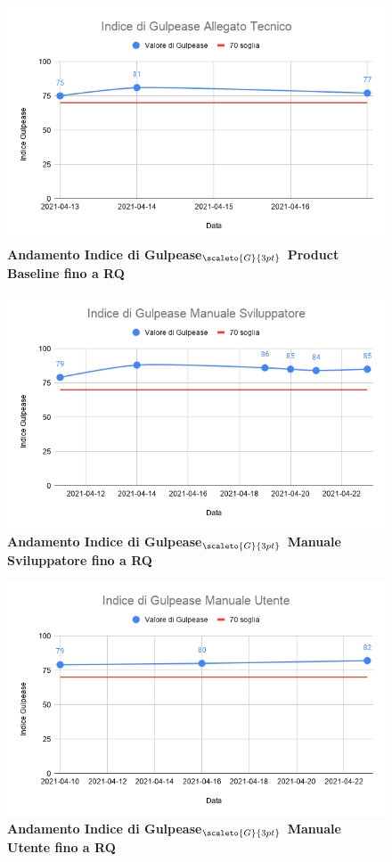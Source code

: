 {{{{{{{{{{{{\begin{figure}[H]
	\begin{center}
		\includegraphics[width=0.8\linewidth]{../immagini/gulpeaseRQ/Indice_di_Gulpease_Allegato_Tecnico.png}
		\caption{\textbf{Andamento Indice di Gulpease$_{\scaleto{G}{3pt}}$ Product Baseline fino a RQ}}
	\end{center}
\end{figure}

\begin{figure}[H]
	\begin{center}
		\includegraphics[width=0.8\linewidth]{../immagini/gulpeaseRQ/Indice_di_Gulpease_Manuale_Sviluppatore.png}
		\caption{\textbf{Andamento Indice di Gulpease$_{\scaleto{G}{3pt}}$ Manuale Sviluppatore fino a RQ}}
	\end{center}
\end{figure}

\begin{figure}[H]
	\begin{center}
		\includegraphics[width=0.8\linewidth]{../immagini/gulpeaseRQ/Indice_di_Gulpease_Manuale_Utente.png}
		\caption{\textbf{Andamento Indice di Gulpease$_{\scaleto{G}{3pt}}$ Manuale Utente fino a RQ}}
	\end{center}
\end{figure}

}}}}}}}}}}}}
